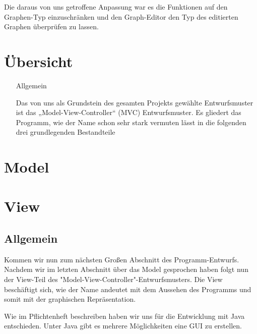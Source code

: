 \documentclass{article}
\begin{document}
			Die daraus von uns getroffene Anpassung war es die Funktionen auf den Graphen-Typ einzuschränken und den Graph-Editor den Typ des editierten Graphen überprüfen zu lassen.
	
	\section{Übersicht}
	\begin{enumerate}
		\item[Allgemein]{
			Das von uns als Grundstein des gesamten Projekts gewählte Entwurfsmuster ist das „Model-View-Controller“ (MVC) Entwurfsmuster.
			Es gliedert das Programm, wie der Name schon sehr stark vermuten lässt in die folgenden drei grundlegenden Bestandteile
			
			
			
		}
	\end{enumerate}
	
	\section{Model}
	
	\section{View}
	\subsection{Allgemein}
		Kommen wir nun zum nächsten Großen Abschnitt des Programm-Entwurfs.
		Nachdem wir im letzten Abschnitt über das Model gesprochen haben folgt nun der View-Teil des "Model-View-Controller"-Entwurfsmusters.
		Die View beschäftigt sich, wie der Name andeutet mit dem Aussehen des Programms und somit mit der graphischen Repräsentation.
		
		Wie im Pflichtenheft beschreiben haben wir uns für die Entwicklung mit Java entschieden.
		Unter Java gibt es mehrere Möglichkeiten eine GUI zu erstellen.
			
\end{document}
